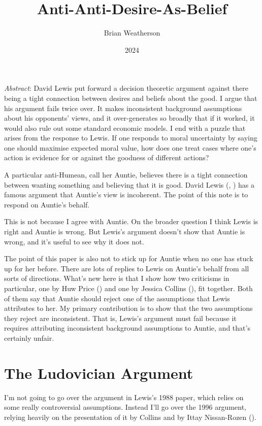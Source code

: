 \documentclass[
  11pt,
  letterpaper,
  DIV=11,
  numbers=noendperiod,
  twoside]{scrartcl}
\title{Anti-Anti-Desire-As-Belief}
\author{Brian Weatherson}
\date{2024}
\renewenvironment{abstract}
 {\vspace{-1.25cm}
 \quotation\small\noindent\emph{Abstract}:}
 {\endquotation}
\begin{document}
\maketitle
\begin{abstract}
David Lewis put forward a decision theoretic argument against there
being a tight connection between desires and beliefs about the good. I
argue that his argument fails twice over. It makes inconsistent
background assumptions about his opponents' views, and it over-generates
so broadly that if it worked, it would also rule out some standard
economic models. I end with a puzzle that arises from the response to
Lewis. If one responds to moral uncertainty by saying one should
maximise expected moral value, how does one treat cases where one's
action is evidence for or against the goodness of different actions?
\end{abstract}


A particular anti-Humean, call her Auntie, believes there is a tight
connection between wanting something and believing that it is good.
David Lewis (,
) has a famous argument that Auntie's view
is incoherent. The point of this note is to respond on Auntie's behalf.

This is not because I agree with Auntie. On the broader question I think
Lewis is right and Auntie is wrong. But Lewis's argument doesn't show
that Auntie is wrong, and it's useful to see why it does not.

The point of this paper is also not to stick up for Auntie when no one
has stuck up for her before. There are lots of replies to Lewis on
Auntie's behalf from all sorts of directions. What's new here is that I
show how two criticisms in particular, one by Huw Price
() and one by Jessica Collins
(), fit together. Both of them say that
Auntie should reject one of the assumptions that Lewis attributes to
her. My primary contribution is to show that the two assumptions they
reject are inconsistent. That is, Lewis's argument must fail because it
requires attributing inconsistent background assumptions to Auntie, and
that's certainly unfair.

\section{The Ludovician Argument}\label{the-ludovician-argument}

I'm not going to go over the argument in Lewis's 1988 paper, which
relies on some really controversial assumptions. Instead I'll go over
the 1996 argument, relying heavily on the presentation of it by Collins
and by Ittay Nissan-Rozen ().
\end{document}
